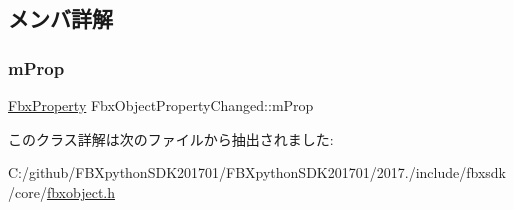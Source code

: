 \subsection{メンバ詳解}
\mbox{\label{class_fbx_object_property_changed_a941055bc705ac87af79a63c46fb7a5a0}} 
\subsubsection{\texorpdfstring{m\+Prop}{mProp}}
{\footnotesize\ttfamily \hyperlink{class_fbx_property}{Fbx\+Property} Fbx\+Object\+Property\+Changed\+::m\+Prop}



このクラス詳解は次のファイルから抽出されました\+:\begin{DoxyCompactItemize}
\item 
C\+:/github/\+F\+B\+Xpython\+S\+D\+K201701/\+F\+B\+Xpython\+S\+D\+K201701/2017./include/fbxsdk/core/\hyperlink{fbxobject_8h}{fbxobject.\+h}\end{DoxyCompactItemize}
